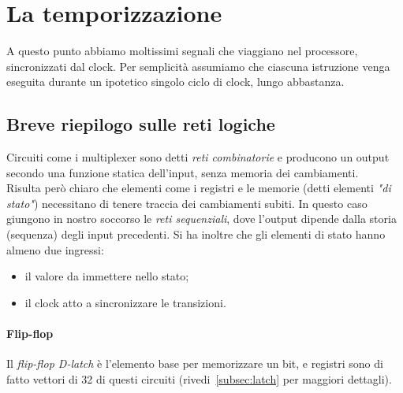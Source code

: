 \documentclass[class=book, crop=false, oneside]{standalone}
\begin{document}
\section{La temporizzazione}
A questo punto abbiamo moltissimi segnali che viaggiano nel processore, sincronizzati dal clock. Per semplicità assumiamo che ciascuna istruzione venga eseguita durante un ipotetico singolo ciclo di clock, lungo abbastanza.

\subsection{Breve riepilogo sulle reti logiche}
Circuiti come i multiplexer sono detti \emph{reti combinatorie} e producono un output secondo una funzione statica dell'input, senza memoria dei cambiamenti.\\
Risulta però chiaro che elementi come i registri e le memorie (detti elementi \emph{"di stato"}) necessitano di tenere traccia dei cambiamenti subiti. In questo caso giungono in nostro soccorso le \emph{reti sequenziali}, dove l'output dipende dalla storia (sequenza) degli input precedenti. Si ha inoltre che gli elementi di stato hanno almeno due ingressi:
\begin{itemize}
	\item il valore da immettere nello stato;
	\item il clock atto a sincronizzare le transizioni.
\end{itemize}

\paragraph{Flip-flop}
Il \emph{flip-flop D-latch} è l’elemento base per memorizzare un bit, e registri sono di fatto vettori di 32 di questi circuiti (rivedi~\ref{subsec:latch} per maggiori dettagli).
\end{document}
